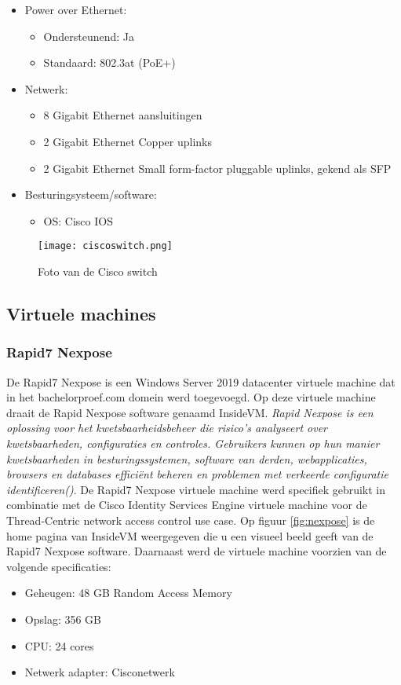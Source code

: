 \begin{itemize}
	\item Power over Ethernet:
	\begin{itemize}
		\item Ondersteunend: Ja
		\item Standaard: 802.3at (PoE+)
	\end{itemize}
	\item Netwerk:
	\begin{itemize}
		\item 8 Gigabit Ethernet aansluitingen
		\item 2 Gigabit Ethernet Copper uplinks
		\item 2 Gigabit Ethernet Small form-factor pluggable uplinks, gekend als SFP
	\end{itemize}
	\item Besturingsysteem/software:
	\begin{itemize}
		\item OS: Cisco IOS
    \end{itemize}
\end{itemize}

\begin{figure}[H]
	\centering
	\texttt{[image: ciscoswitch.png]}
	\caption{Foto van de Cisco switch}
	\label{fig:switch}
\end{figure}
\newpage
\subsection{Virtuele machines}
\subsubsection{Rapid7 Nexpose}
De Rapid7 Nexpose is een Windows Server 2019 datacenter virtuele machine dat in het bachelorproef.com domein werd toegevoegd. Op deze virtuele machine draait de Rapid Nexpose software genaamd InsideVM. \textit{Rapid Nexpose is een oplossing voor het kwetsbaarheidsbeheer die risico's analyseert over kwetsbaarheden, configuraties en controles. Gebruikers kunnen op hun manier kwetsbaarheden in besturingssystemen, software van derden, webapplicaties, browsers en databases efficiënt beheren en problemen met verkeerde configuratie identificeren(\cite{Rapid7Li})}. De Rapid7 Nexpose virtuele machine werd specifiek gebruikt in combinatie met de Cisco Identity Services Engine virtuele machine voor de Thread-Centric network access control use case. Op figuur \ref{fig:nexpose} is de home pagina van InsideVM weergegeven die u een visueel beeld geeft van de Rapid7 Nexpose software.
\newline\newline
Daarnaast werd de virtuele machine voorzien van de volgende specificaties: 
\begin{itemize}
	\item Geheugen: 48 GB Random Access Memory
	\item Opslag: 356 GB
	\item CPU: 24 cores
	\item Netwerk adapter: Cisco\textunderscore netwerk
\end{itemize}

